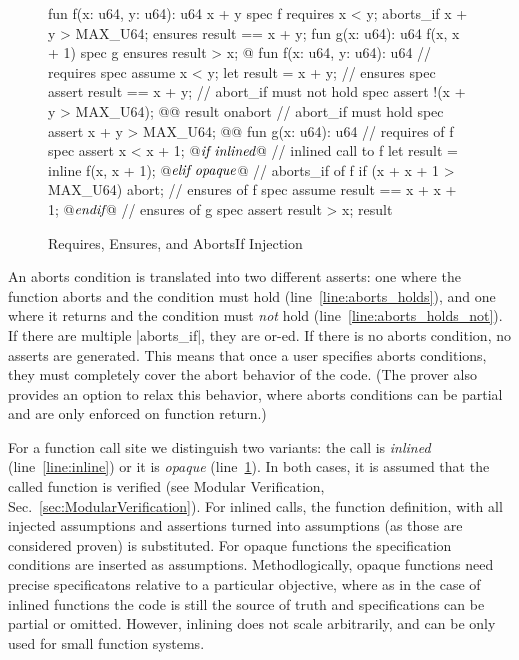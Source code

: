 \begin{figure}[t!]
  \caption{Requires, Ensures, and AbortsIf Injection}
  \label{fig:RequiresEnsuresAbortsIf}
  \centering
\begin{MoveBox}
  fun f(x: u64, y: u64): u64 { x + y }
  spec f {
    requires x < y;
    aborts_if x + y > MAX_U64;
    ensures result == x + y;
  }
  fun g(x: u64): u64 { f(x, x + 1) }
  spec g {
    ensures result > x;
  }
  @\transform@
  fun f(x: u64, y: u64): u64 {
    // requires
    spec assume x < y;
    let result = x + y;
    // ensures
    spec assert result == x + y;
    // abort_if must not hold
    spec assert !(x + y > MAX_U64); @\label{line:aborts_holds_not}@
    result
  } onabort {
    // abort_if must hold
    spec assert x + y > MAX_U64; @\label{line:aborts_holds}@
  }
  fun g(x: u64): u64 {
    // requires of f
    spec assert x < x + 1;
@$\textrm{\it if inlined}$\label{line:inline}@
    // inlined call to f
    let result = inline f(x, x + 1);
@$\textrm{\it elif opaque}$\label{line:opaque}@
    // aborts_if of f
    if (x + x + 1 > MAX_U64) abort;
    // ensures of f
    spec assume result == x + x + 1;
@$\textrm{\it endif}$@
    // ensures of g
    spec assert result > x;
    result
  }
\end{MoveBox}
\end{figure}

An aborts condition is translated into two different asserts: one where the
function aborts and the condition must hold (line~\ref{line:aborts_holds}), and
one where it returns and the condition must \emph{not} hold
(line~\ref{line:aborts_holds_not}). If there are multiple |aborts_if|, they are
or-ed. If there is no aborts condition, no asserts are generated. This means
that once a user specifies aborts conditions, they must completely cover the
abort behavior of the code. (The prover also provides an option to relax this
behavior, where aborts conditions can be partial and are only enforced on
function return.)

For a function call site we distinguish two variants: the call is \emph{inlined}
(line~\ref{line:inline}) or it is \emph{opaque} (line~\ref{line:opaque}). In
both cases, it is assumed that the called function is verified (see Modular
Verification, Sec.~\ref{sec:ModularVerification}). For inlined calls, the
function definition, with all injected assumptions and assertions turned into
assumptions (as those are considered proven) is substituted. For opaque
functions the specification conditions are inserted as
assumptions. Methodlogically, opaque functions need precise specificatons
relative to a particular objective, where as in the case of inlined functions
the code is still the source of truth and specifications can be partial or
omitted. However, inlining does not scale arbitrarily, and can be only used for
small function systems.

